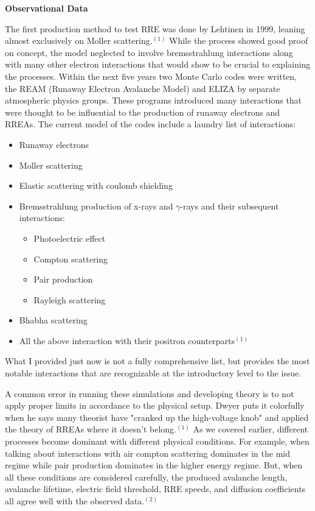 \documentclass[11pt]{article}
\begin{document}
\begin{multicols*}{2}
    \noindent
{\bf \LARGE Observational Data}

    \quad \quad The first production method to test RRE was done by Lehtinen in 1999, leaning almost exclusively on Moller scattering.$^{(1)}$ While the process showed good proof on concept, the model neglected to involve bremsstrahlung interactions along with many other electron interactions that would show to be crucial to explaining the processes. Within the next five years two Monte Carlo codes were written, the REAM (Runaway Electron Avalanche Model) and ELIZA by separate atmospheric physics groups. These programs introduced many interactions that were thought to be influential to the production of runaway electrons and RREAs. The current model of the codes include a laundry list of interactions:
    \begin{itemize}
        \item Runaway electrons
        \item Moller scattering
        \item Elastic scattering with coulomb shielding
        \item Bremsstrahlung production of x-rays and $\gamma$-rays and their subsequent interactions:
        \begin{itemize}
            \item Photoelectric effect
            \item Compton scattering
            \item Pair production
            \item Rayleigh scattering
        \end{itemize}
        \item Bhabha scattering
        \item All the above interaction with their positron counterparts$^{(1)}$
    \end{itemize}
    What I provided just now is not a fully comprehensive list, but provides the most notable interactions that are recognizable at the introductory level to the issue. 
    
    A common error in running these simulations and developing theory is to not apply proper limits in accordance to the physical setup. Dwyer puts it colorfully when he says many theorist have "cranked up the high-voltage knob" and applied the theory of RREAs where it doesn't belong.$^{(1)}$ As we covered earlier, different processes become dominant with different physical conditions. For example, when talking about interactions with air compton scattering dominates in the mid regime while pair production dominates in the higher energy regime. But, when all these conditions are considered carefully, the produced avalanche length, avalanche lifetime, electric field threshold, RRE speeds, and diffusion coefficients all agree well with the observed data.$^{(2)}$
    

\end{multicols*}
\end{document}
